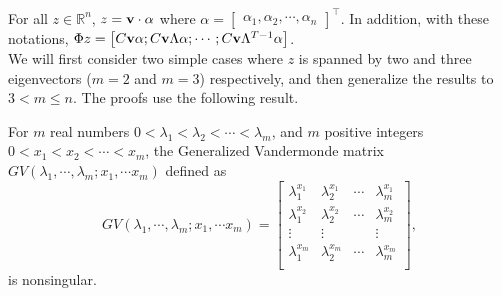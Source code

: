 \documentclass[twocolumn]{autart}    %
\begin{document}
For all $z \in \mathbb{R}^n$, $ z = {\bf v} \cdot \alpha$ where $\alpha = \begin{bmatrix} \alpha_1, \alpha_2, \cdots, \alpha_n \end{bmatrix}^\top $.
In addition, with these notations, $\Phi z = \begin{bmatrix} C {\bf v} \alpha; C {\bf v} \Lambda \alpha; \cdots; C {\bf v} \Lambda^{T-1} \alpha \end{bmatrix}$.
\\
We will first consider two simple cases where $z$ is spanned by two and three eigenvectors ($m = 2$ and $m =3 $) respectively, and then generalize the results to $3 < m \leq n$. The proofs use the following result.
\vspace{-0.35cm}
\begin{lem} \label{lem:gv}
For $m$ real numbers $0< \lambda_1 < \lambda_2 < \cdots < \lambda_m$, and $m$ positive integers $0< x_1 < x_2 < \cdots < x_m$, the Generalized Vandermonde matrix $GV(\lambda_1, \cdots, \lambda_m; x_1, \cdots x_m)$ defined as
\begin{equation}
GV(\lambda_1, \cdots, \lambda_m; x_1, \cdots x_m) = 
	\begin{bmatrix} \lambda_1^{x_1} & \lambda_2^{x_1} & \cdots & \lambda_m^{x_1} \\
			\lambda_1^{x_2} & \lambda_2^{x_2} & \cdots & \lambda_m^{x_2} \\
			\vdots & \vdots  & & \vdots\\
			\lambda_1^{x_m} & \lambda_2^{x_m} & \cdots & \lambda_m^{x_m} \\
	\end{bmatrix},
	\end{equation}\nonumber
is nonsingular.
\end{lem}
 \vspace{-0.4cm}
\end{document}
